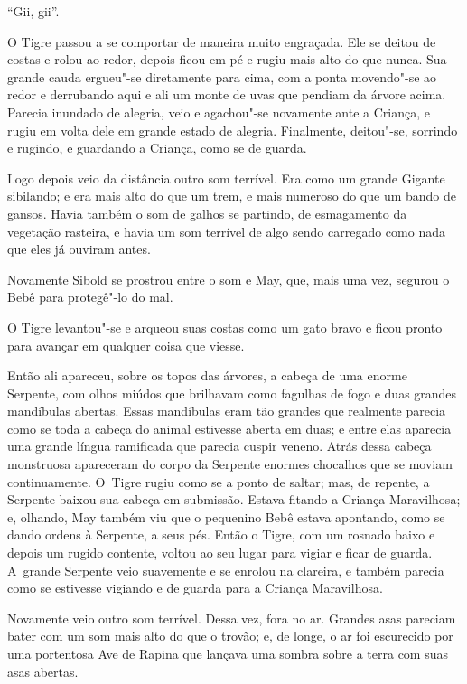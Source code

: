 ``Gii, gii''.

O Tigre passou a se comportar de maneira muito engraçada. Ele se deitou
de costas e rolou ao redor, depois ficou em pé e rugiu mais alto do que
nunca. Sua grande cauda ergueu"-se diretamente para cima, com a ponta
movendo"-se ao redor e derrubando aqui e ali um monte de uvas que pendiam
da árvore acima. Parecia inundado de alegria, veio e agachou"-se
novamente ante a Criança, e rugiu em volta dele em grande estado de
alegria. Finalmente, deitou"-se, sorrindo e rugindo, e guardando a
Criança, como se de guarda.

Logo depois veio da distância outro som terrível. Era como um grande
Gigante sibilando; e era mais alto do que um trem, e mais numeroso do
que um bando de gansos. Havia também o som de galhos se partindo, de
esmagamento da vegetação rasteira, e havia um som terrível de algo sendo
carregado como nada que eles já ouviram antes.

Novamente Sibold se prostrou entre o som e May, que, mais uma vez,
segurou o Bebê para protegê"-lo do mal.

O Tigre levantou"-se e arqueou suas costas como um gato bravo e ficou
pronto para avançar em qualquer coisa que viesse.

Então ali apareceu, sobre os topos das árvores, a cabeça de uma enorme
Serpente, com olhos miúdos que brilhavam como fagulhas de fogo e duas
grandes mandíbulas abertas. Essas mandíbulas eram tão grandes que
realmente parecia como se toda a cabeça do animal estivesse aberta em
duas; e entre elas aparecia uma grande língua ramificada que parecia
cuspir veneno. Atrás dessa cabeça monstruosa apareceram do corpo da
Serpente enormes chocalhos que se moviam continuamente. O~Tigre rugiu
como se a ponto de saltar; mas, de repente, a Serpente baixou sua cabeça
em submissão. Estava fitando a Criança Maravilhosa; e, olhando, May
também viu que o pequenino Bebê estava apontando, como se dando ordens à
Serpente, a seus pés. Então o Tigre, com um rosnado baixo e depois um
rugido contente, voltou ao seu lugar para vigiar e ficar de guarda. A~grande Serpente veio suavemente e se enrolou na clareira, e também
parecia como se estivesse vigiando e de guarda para a Criança
Maravilhosa.

Novamente veio outro som terrível. Dessa vez, fora no ar. Grandes asas
pareciam bater com um som mais alto do que o trovão; e, de longe, o ar
foi escurecido por uma portentosa Ave de Rapina que lançava uma sombra
sobre a terra com suas asas abertas.

